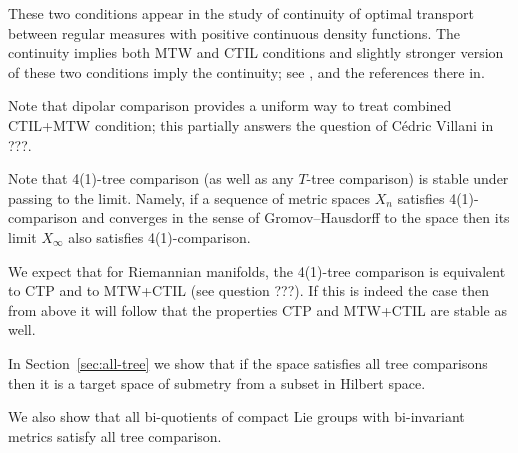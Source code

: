 These two conditions appear in the study of continuity of optimal transport between regular measures with positive continuous density functions.
The continuity implies both MTW and CTIL conditions and slightly stronger version of these two conditions imply the continuity;
see \cite{FRV-Nec+Suf}, \cite{MTW+CTIL} and the references there in.


Note that dipolar comparison provides a uniform way to treat combined CTIL+MTW condition;
this partially answers the question of Cédric Villani in ???.

Note that 4(1)-tree comparison (as well as any $T$-tree comparison) is stable under passing to the limit.
Namely, if a sequence of metric spaces $X_n$ satisfies 4(1)-comparison and converges in the sense of Gromov--Hausdorff to the space  then its limit $X_\infty$ also satisfies 4(1)-comparison.

We expect that for Riemannian manifolds, the 4(1)-tree comparison is equivalent to CTP and to MTW+CTIL (see question ???).
If this is indeed the case then from above it will follow that the properties CTP and MTW+CTIL are stable as well.

In Section~\ref{sec:all-tree} we show that if the space satisfies all tree comparisons then it is a target space of submetry from a subset in Hilbert space.

We also show that all bi-quotients of compact Lie groups with bi-invariant metrics satisfy all tree comparison.

